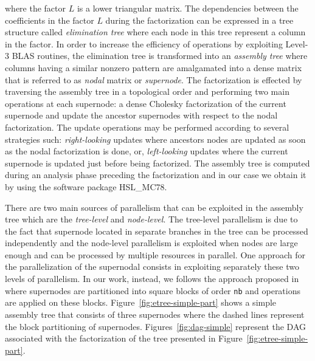 \documentclass{article}
\begin{document}
where the factor $L$ is a lower triangular matrix. The dependencies
between the coefficients in the factor $L$ during the factorization
can be expressed in a tree structure called \textit{elimination tree}
where each node in this tree represent a column in the factor. In
order to increase the efficiency of operations by exploiting Level-3
BLAS routines, the elimination tree is transformed into an
\textit{assembly tree} where columns having a similar nonzero pattern
are amalgamated into a dense matrix that is referred to as
\textit{nodal} matrix or \textit{supernode}. The factorization is
effected by traversing the assembly tree in a topological order and
performing two main operations at each supernode: a dense Cholesky
factorization of the current supernode and update the ancestor
supernodes with respect to the nodal factorization. The update
operations may be performed according to several strategies such:
\textit{right-looking} updates where ancestors nodes are updated as
soon as the nodal factorization is done, or, \textit{left-looking}
updates where the current supernode is updated just before being
factorized. The assembly tree is computed during an analysis phase
preceding the factorization and in our case we obtain it by using the
software package HSL\_MC78.

There are two main sources of parallelism that can be exploited in the
assembly tree which are the \textit{tree-level} and
\textit{node-level}. The tree-level parallelism is due to the fact
that supernode located in separate branches in the tree can be
processed independently and the node-level parallelism is exploited
when nodes are large enough and can be processed by multiple resources
in parallel. One approach for the parallelization of the supernodal
consists in exploiting separately these two levels of parallelism. In
our work, instead, we follows the approach proposed in~\cite{h.r.s:10}
where supernodes are partitioned into square blocks of order
\texttt{nb} and operations are applied on these
blocks. Figure~\ref{fig:etree-simple-part} shows a simple assembly
tree that consists of three supernodes where the dashed lines
represent the block partitioning of
supernodes. Figures~\ref{fig:dag-simple} represent the DAG associated
with the factorization of the tree presented in
Figure~\ref{fig:etree-simple-part}.
\end{document}
